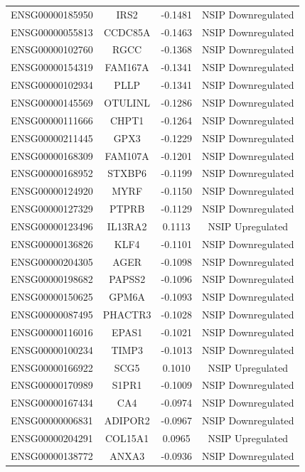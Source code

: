 \documentclass[
]{article}
\begin{document}
\begin{singlespace}
\begin{longtable}[t]{lccc}
\endfoot
\bottomrule
\endlastfoot
ENSG00000185950 & IRS2 & -0.1481 & NSIP Downregulated\\
ENSG00000055813 & CCDC85A & -0.1463 & NSIP Downregulated\\
ENSG00000102760 & RGCC & -0.1368 & NSIP Downregulated\\
ENSG00000154319 & FAM167A & -0.1341 & NSIP Downregulated\\
ENSG00000102934 & PLLP & -0.1341 & NSIP Downregulated\\
\addlinespace
ENSG00000145569 & OTULINL & -0.1286 & NSIP Downregulated\\
ENSG00000111666 & CHPT1 & -0.1264 & NSIP Downregulated\\
ENSG00000211445 & GPX3 & -0.1229 & NSIP Downregulated\\
ENSG00000168309 & FAM107A & -0.1201 & NSIP Downregulated\\
ENSG00000168952 & STXBP6 & -0.1199 & NSIP Downregulated\\
\addlinespace
ENSG00000124920 & MYRF & -0.1150 & NSIP Downregulated\\
ENSG00000127329 & PTPRB & -0.1129 & NSIP Downregulated\\
ENSG00000123496 & IL13RA2 & 0.1113 & NSIP Upregulated\\
ENSG00000136826 & KLF4 & -0.1101 & NSIP Downregulated\\
ENSG00000204305 & AGER & -0.1098 & NSIP Downregulated\\
\addlinespace
ENSG00000198682 & PAPSS2 & -0.1096 & NSIP Downregulated\\
ENSG00000150625 & GPM6A & -0.1093 & NSIP Downregulated\\
ENSG00000087495 & PHACTR3 & -0.1028 & NSIP Downregulated\\
ENSG00000116016 & EPAS1 & -0.1021 & NSIP Downregulated\\
ENSG00000100234 & TIMP3 & -0.1013 & NSIP Downregulated\\
\addlinespace
ENSG00000166922 & SCG5 & 0.1010 & NSIP Upregulated\\
ENSG00000170989 & S1PR1 & -0.1009 & NSIP Downregulated\\
ENSG00000167434 & CA4 & -0.0974 & NSIP Downregulated\\
ENSG00000006831 & ADIPOR2 & -0.0967 & NSIP Downregulated\\
ENSG00000204291 & COL15A1 & 0.0965 & NSIP Upregulated\\
\addlinespace
ENSG00000138772 & ANXA3 & -0.0936 & NSIP Downregulated\\

\end{longtable}
\end{singlespace}
\end{document}
